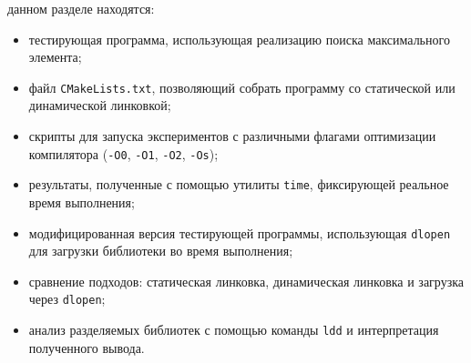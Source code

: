  данном разделе находятся:

\begin{itemize}
  \item тестирующая программа, использующая реализацию поиска максимального элемента;
  \item файл \texttt{CMakeLists.txt}, позволяющий собрать программу со статической или динамической линковкой;
  \item скрипты для запуска экспериментов с различными флагами оптимизации компилятора (\texttt{-O0}, \texttt{-O1}, \texttt{-O2}, \texttt{-Os});
  \item результаты, полученные с помощью утилиты \texttt{time}, фиксирующей реальное время выполнения;
  \item модифицированная версия тестирующей программы, использующая \texttt{dlopen} для загрузки библиотеки во время выполнения;
  \item сравнение подходов: статическая линковка, динамическая линковка и загрузка через \texttt{dlopen};
  \item анализ разделяемых библиотек с помощью команды \texttt{ldd} и интерпретация полученного вывода.
\end{itemize}